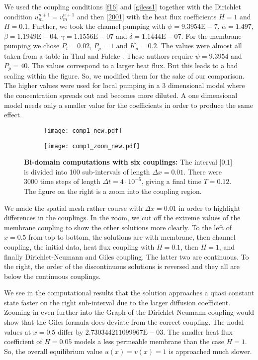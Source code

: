 We used the coupling conditions \eqref{f16} and \eqref{giless1} together with 
the Dirichlet condition $u_m^{n+1}=v_m^{n+1}$ and then \eqref{2001}
with the heat flux coefficients $H=1$ and $H=0.1$. Further, we took the channel pumping with $\psi = 9.3954\text{E}-7$,
$\alpha = 1.497$, $\beta = 1.1949\text{E}-04$, $\gamma = 1.1556\text{E}-07$ and $\delta = 1.1444\text{E}-07$. 
For the membrane pumping we chose $P_l=0.02$, $P_p=1$ and $K_d=0.2$.
The values were almost all taken from a table in Thul and Falcke \cite{l11}. 
These authors require $\psi = 9.3954$ and $P_p =40$. The values correspond to a larger heat flux.
But this leads to a bad scaling within the figure. So, we modified them for the sake of our comparison.
The higher values were used for local pumping in a 3 dimensional model where the concentration spreads out and becomes more diluted.
A one dimensional model needs only a smaller value for the coefficients in order to produce the same effect.

%
\begin{figure}
%
\begin{subfigure}{.49\textwidth}
  \centering
  \texttt{[image: comp1\_new.pdf]}
  \caption{}
\end{subfigure}
%
\begin{subfigure}{.49\textwidth}
  \centering
  \texttt{[image: comp1\_zoom\_new.pdf]}
  \caption{}
\end{subfigure}
%
\caption{\textbf{Bi-domain computations with six couplings:} 
\label{comp1}
The interval [0,1] is divided into 100 sub-intervals of length $\Delta x=0.01$. 
There were $3000$ time steps of length $\Delta t=4\cdot 10^{-5}$, giving a final time $T=0.12$. 
The figure on the right is a zoom into the coupling region.}
%
\end{figure}

We made the spatial mesh rather course with $\Delta x=0.01$ in order to highlight differences in the couplings.
In the zoom, we cut off the extreme values of the membrane coupling to show the other
solutions more clearly. To the left of $x=0.5$ from top to bottom, the solutions are with
membrane, then channel coupling, the initial data, heat flux coupling with $H=0.1$, then $H=1$, and finally Dirichlet-Neumann and Giles coupling.
The latter two are continuous. To the right, the order of the discontinuous solutions is reversed
and they all are below the continuous couplings.

We see in the computational results that the solution approaches a quasi constant state 
faster on the right sub-interval due to the larger diffusion coefficient. 
Zooming in even further into the Graph of the Dirichlet-Neumann coupling would show
that the Giles formula does deviate from the correct coupling.
The nodal values at $x=0.5$ differ by $2.730344211099967\text{E}-03$.
The smaller heat flux coefficient of $H=0.05$ models a less permeable membrane than the case $H=1$. 
So, the overall equilibrium value $u(x)=v(x)=1$ is approached much slower. 

